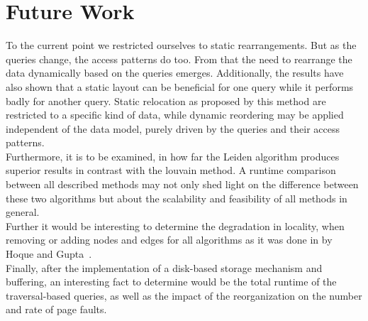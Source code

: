 \section{Future Work}\label{\positionnumber}
To the current point we restricted ourselves to static rearrangements.
But as the queries change, the access patterns do too.
From that the need to rearrange the data dynamically based on the queries emerges.
Additionally, the results have also shown that a static layout can be beneficial for one query while it performs badly for another query.
Static relocation as proposed by this method are restricted to a specific kind of data, while dynamic reordering may be applied independent of the data model, purely driven by the queries and their access patterns. \\
Furthermore, it is to be examined, in how far the Leiden algorithm produces superior results in contrast with the louvain method. 
A runtime comparison between all described methods may not only shed light on the difference between these two algorithms but about the scalability and feasibility of all methods in general. \\
Further it would be interesting to determine the degradation in locality, when removing or adding nodes and edges for all algorithms as it was done in by Hoque and Gupta~\autocite{hoque2012disk}. \\
Finally, after the implementation of a disk-based storage mechanism and buffering, an interesting fact to determine would be the total runtime of the traversal-based queries, as well as the impact of the reorganization on the number and rate of page faults.

